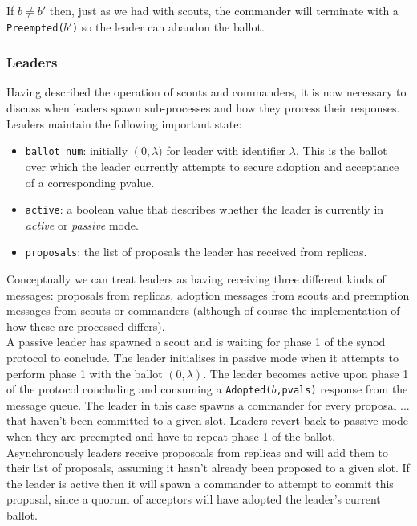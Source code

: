 If $b \neq b'$ then, just as we had with scouts, the commander will terminate with a  \texttt{Preempted($b'$)} so the leader can abandon the ballot.

\subsubsection{Leaders}

Having described the operation of scouts and commanders, it is now necessary to discuss when leaders spawn sub-processes and how they process their responses. Leaders maintain the following important state:

\begin{itemize}
  \item \texttt{ballot\_num}: initially $\left(0,\lambda)$ for leader with identifier $\lambda$. This is the ballot over which the leader currently attempts to secure adoption and acceptance of a corresponding pvalue.
  \item \texttt{active}: a boolean value that describes whether the leader is currently in \emph{active} or \emph{passive} mode.
  \item \texttt{proposals}: the list of proposals the leader has received from replicas.
\end{itemize}

Conceptually we can treat leaders as having receiving three different kinds of messages: proposals from replicas, adoption messages from scouts and preemption messages from scouts or 
commanders (although of course the implementation of how these are processed differs). \\

{\color{red}A passive leader has spawned a scout and is waiting for phase 1 of the synod protocol to conclude. The leader initialises in passive mode when it attempts to perform phase 1 with the ballot $\left(0, \lambda \right)$. The leader becomes active upon phase 1 of the protocol concluding and consuming a \texttt{Adopted($b$,pvals)} response from the message queue. The leader in this case spawns a commander for every proposal ... that haven't been committed to a given slot. Leaders revert back to passive mode when they are preempted and have to repeat phase 1 of the ballot. Asynchronously leaders receive proposoals from replicas and will add them to their list of proposals, assuming it hasn't already been proposed to a given slot. If the leader is active then it will spawn a commander to attempt to commit this proposal, since a quorum of acceptors will have adopted the leader's current ballot.}





















